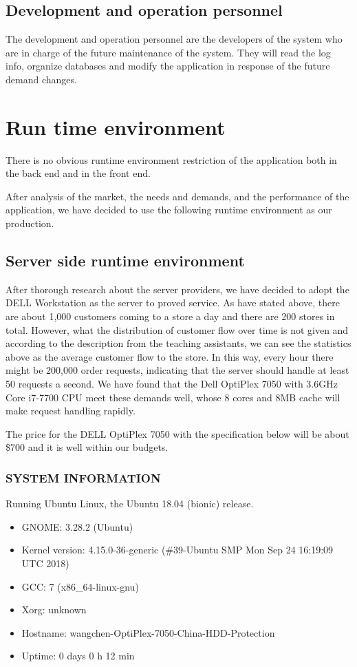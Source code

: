 \documentclass[a4paper]{report}
\begin{document}
\subsection{Development and operation personnel}
The development and operation personnel are the developers of the system who are in charge of the future maintenance of the system. They will read the log info, organize databases and modify the application in response of the future demand changes.
\section{Run time environment}
There is no obvious runtime environment restriction of the application both in the back end and in the front end.
\par
After analysis of the market, the needs and demands, and the performance of the application, we have decided to use the following runtime environment as our production. 
\subsection{Server side runtime environment}
After thorough research about the server providers, we have decided to adopt the DELL Workstation as the server to proved service. As have stated above, there are about 1,000 customers coming to a store a day and there are 200 stores in total. However, what the distribution of customer flow over time is not given and according to the description from the teaching assistants, we can see the statistics above as the average customer flow to the store. In this way, every hour there might be 200,000 order requests, indicating that the server should handle at least 50 requests a second. We have found that the Dell OptiPlex 7050 with 3.6GHz Core i7-7700 CPU meet these demands well, whose 8 cores and 8MB cache will make request handling rapidly.
\par
The price for the DELL OptiPlex 7050 with the specification below will be about \$700  and it is well within our budgets. 
\subsubsection{SYSTEM INFORMATION}
Running Ubuntu Linux, the Ubuntu 18.04 (bionic) release.
\begin{itemize}
\item GNOME: 3.28.2 (Ubuntu)
\item Kernel version: 4.15.0-36-generic (\#39-Ubuntu SMP Mon Sep 24 16:19:09 UTC 2018)
\item GCC: 7 (x86\_64-linux-gnu)
\item Xorg: unknown
\item Hostname: wangchen-OptiPlex-7050-China-HDD-Protection
\item	Uptime: 0 days 0 h 12 min
\end{itemize}
\end{document}
